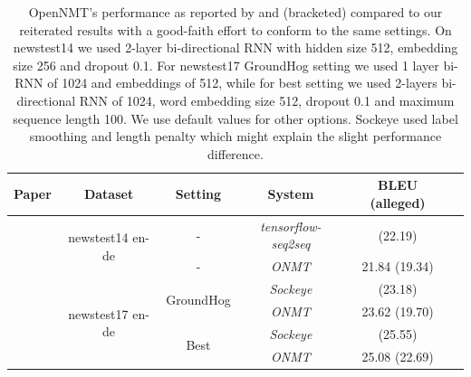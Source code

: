 \documentclass[]{article}
\begin{document}
\begin{table}
\small
\centering
\begin{tabular}{cccccc}
    \toprule
    Paper & Dataset & Setting & System  & BLEU (alleged)\\
    \midrule
    \multirow{2}{*}{\cite{britz2017massive}} & \multirow{2}{*}{newstest14 en-de} & - &\textit{tensorflow-seq2seq}& (22.19) &  \\
     &  & - &\textit{ONMT}& 21.84 (19.34) &  \\
    \midrule
    \multirow{4}{*}{\cite{hieber2017sockeye}} & \multirow{4}{*}{newstest17 en-de} & \multirow{ 2}{*}{GroundHog} & \textit{Sockeye}& (23.18) &  \\
     &  &  & \textit{ONMT}& 23.62 (19.70) &  \\
     &  & \multirow{ 2}{*}{Best} & \textit{Sockeye}& (25.55) &  \\
     &  &  & \textit{ONMT}& 25.08 (22.69) &  \\
    \bottomrule
  \end{tabular}

  \caption{ \small \label{tab:results-updated} OpenNMT's performance as reported by \cite{britz2017massive} and \cite{hieber2017sockeye} (bracketed) compared to our reiterated results with a good-faith effort to conform to the same settings. On newstest14 we used 2-layer bi-directional RNN with hidden size 512, embedding size 256 and dropout 0.1. For newstest17 GroundHog setting we used 1 layer bi-RNN of 1024 and embeddings of 512, while for best setting we used 2-layers bi-directional RNN of 1024, word embedding size 512, dropout 0.1 and maximum sequence length 100. We use default values for other options. Sockeye used label smoothing \citep{pereyra2017regularizing} and length penalty which might explain the slight performance difference.}
\end{table}
\end{document}
